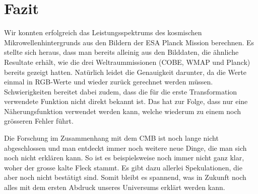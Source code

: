 \section{Fazit}
Wir konnten erfolgreich das Leistungsspektrums des kosmischen 
Mikrowellenhintergrunds aus den Bildern der ESA Planck Mission berechnen. Es 
stellte sich heraus, dass man bereits alleinig aus den Bilddaten, die ähnliche 
Resultate erhält, wie die drei Weltraummissionen (COBE, WMAP und Planck) 
bereits gezeigt hatten. Natürlich leidet die Genauigkeit darunter, da die Werte 
einmal in RGB-Werte und wieder zurück gerechnet werden müssen. Schwierigkeiten 
bereitet dabei zudem, dass die für die erste Transformation verwendete Funktion 
nicht direkt bekannt ist. Das hat zur Folge, dass nur eine Näherungsfunktion 
verwendet werden kann, welche wiederum zu einem noch grösseren Fehler führt.

Die Forschung im Zusammenhang mit dem CMB ist noch lange nicht abgeschlossen 
und man entdeckt immer noch weitere neue Dinge, die man sich noch nicht 
erklären kann. So ist es beispielsweise noch immer nicht ganz klar, woher der 
grosse kalte Fleck stammt. Es gibt dazu allerlei Spekulationen, die aber 
%
%
noch nicht bestätigt sind. Somit bleibt es spannend, was in Zukunft noch alles 
mit dem ersten Abdruck unseres Universums erklärt werden kann.
